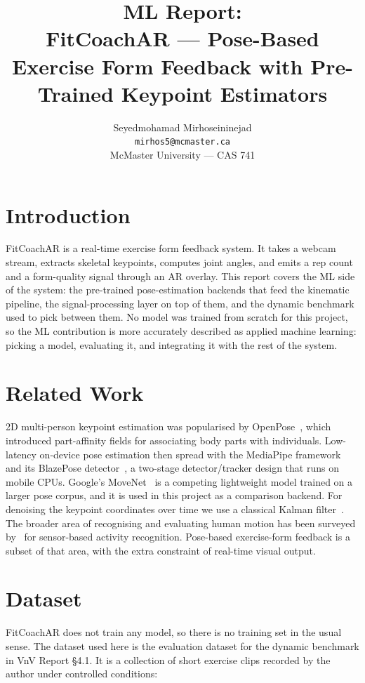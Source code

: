 \documentclass[11pt]{article}
\title{ML Report:\\FitCoachAR --- Pose-Based Exercise Form Feedback
with Pre-Trained Keypoint Estimators}
\author{Seyedmohamad Mirhoseininejad \\
  \texttt{mirhos5@mcmaster.ca} \\
  McMaster University --- CAS 741}
\begin{document}
\maketitle

\section{Introduction}

FitCoachAR is a real-time exercise form feedback system. It takes a
webcam stream, extracts skeletal keypoints, computes joint angles, and
emits a rep count and a form-quality signal through an AR overlay.
This report covers the ML side of the system: the pre-trained
pose-estimation backends that feed the kinematic pipeline, the
signal-processing layer on top of them, and the dynamic benchmark used
to pick between them. No model was trained from scratch for this
project, so the ML contribution is more accurately described as
applied machine learning: picking a model, evaluating it, and
integrating it with the rest of the system.

\section{Related Work}

2D multi-person keypoint estimation was popularised by
OpenPose~\citep{Cao2019OpenPose}, which introduced part-affinity
fields for associating body parts with individuals. Low-latency
on-device pose estimation then spread with the MediaPipe
framework~\citep{Lugaresi2019MediaPipe} and its BlazePose
detector~\citep{Bazarevsky2020BlazePose}, a two-stage
detector/tracker design that runs on mobile CPUs. Google's
MoveNet~\citep{MoveNet2021} is a competing lightweight model trained
on a larger pose corpus, and it is used in this project as a
comparison backend. For denoising the keypoint coordinates over time
we use a classical Kalman filter~\citep{Kalman1960}. The broader area
of recognising and evaluating human motion has been surveyed
by~\citet{Chen2021HAR} for sensor-based activity recognition.
Pose-based exercise-form feedback is a subset of that area, with the
extra constraint of real-time visual output.

\section{Dataset}

FitCoachAR does not train any model, so there is no training set in
the usual sense. The dataset used here is the evaluation dataset for
the dynamic benchmark in VnV Report \S4.1. It is a collection of
short exercise clips recorded by the author under controlled
conditions:
\end{document}
